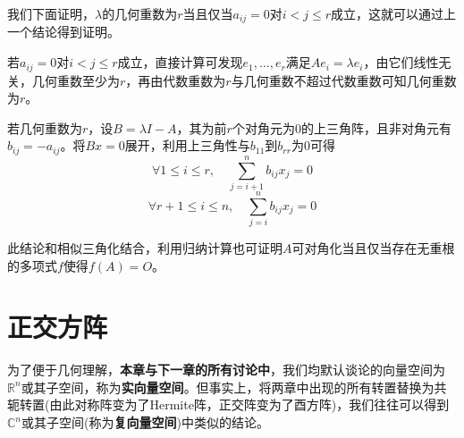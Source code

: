 \documentclass[a4paper,UTF8,fontset=windows]{ctexart}
\newcommand*{\note}{\noindent *}
\begin{document}
\begin{enumerate}
    我们下面证明，$\lambda$的几何重数为$r$当且仅当$a_{ij}=0$对$i<j\le r$成立，这就可以通过上一个结论得到证明。

    若$a_{ij}=0$对$i<j\le r$成立，直接计算可发现$e_1,\dots,e_r$满足$Ae_i=\lambda e_i$，由它们线性无关，几何重数至少为$r$，再由代数重数为$r$与几何重数不超过代数重数可知几何重数为$r$。

    若几何重数为$r$，设$B=\lambda I-A$，其为前$r$个对角元为0的上三角阵，且非对角元有$b_{ij}=-a_{ij}$。将$Bx=0$展开，利用上三角性与$b_{11}$到$b_{rr}$为0可得
    $$\forall 1\le i\le r,\quad\sum_{j=i+1}^nb_{ij}x_j=0$$
    $$\forall r+1\le i\le n,\quad\sum_{j=i}^nb_{ij}x_j=0$$

    \note 此结论和相似三角化结合，利用归纳计算也可证明$A$可对角化当且仅当存在无重根的多项式$f$使得$f(A)=O$。
\end{enumerate}

\section{正交方阵}
\note 为了便于几何理解，\textbf{本章与下一章的所有讨论中}，我们均默认谈论的向量空间为$\mathbb{R}^n$或其子空间，称为\textbf{实向量空间}。但事实上，将两章中出现的所有转置替换为共轭转置(由此对称阵变为了Hermite阵，正交阵变为了酉方阵)，我们往往可以得到$\mathbb{C}^n$或其子空间(称为\textbf{复向量空间})中类似的结论。
\end{document}
